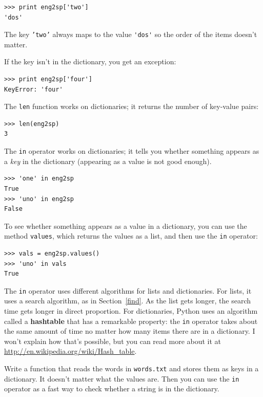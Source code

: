\documentclass[10pt]{book}
\begin{document}
\begin{CJK}{UTF8}{gbsn}
\begin{verbatim}
>>> print eng2sp['two']
'dos'
\end{verbatim}
%
The key {\tt 'two'} always maps to the value \verb"'dos'" so the order
of the items doesn't matter.

If the key isn't in the dictionary, you get an exception:

\begin{verbatim}
>>> print eng2sp['four']
KeyError: 'four'
\end{verbatim}
%
The {\tt len} function works on dictionaries; it returns the
number of key-value pairs:

\begin{verbatim}
>>> len(eng2sp)
3
\end{verbatim}
%
The {\tt in} operator works on dictionaries; it tells you whether
something appears as a {\em key} in the dictionary (appearing
as a value is not good enough).

\begin{verbatim}
>>> 'one' in eng2sp
True
>>> 'uno' in eng2sp
False
\end{verbatim}
%
To see whether something appears as a value in a dictionary, you
can use the method {\tt values}, which returns the values as
a list, and then use the {\tt in} operator:

\begin{verbatim}
>>> vals = eng2sp.values()
>>> 'uno' in vals
True
\end{verbatim}
%
The {\tt in} operator uses different algorithms for lists and
dictionaries.  For lists, it uses a search algorithm, as in
Section~\ref{find}.  As the list gets longer, the search time gets
longer in direct proportion.  For dictionaries, Python uses an
algorithm called a {\bf hashtable} that has a remarkable property: the
{\tt in} operator takes about the same amount of time no matter how
many items there are in a dictionary.  I won't explain how that's
possible, but you can read more about it at
\url{http://en.wikipedia.org/wiki/Hash_table}.

\begin{exercise}
\label{wordlist2}

Write a function that reads the words in {\tt words.txt} and
stores them as keys in a dictionary.  It doesn't matter what the
values are.  Then you can use the {\tt in} operator
as a fast way to check whether a string is in
the dictionary.


\end{exercise}
\end{CJK}
\end{document}

